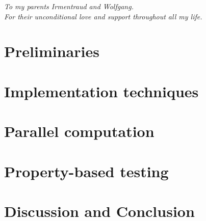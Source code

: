 \documentclass[oneside]{book}
\begin{document}
\clearpage
\begin{center}
    \thispagestyle{empty}
    \vspace*{\fill}
    \textit{To my parents Irmentraud and Wolfgang. \\ For their unconditional love and support throughout all my life.}
    \vspace*{\fill}
\end{center}

\clearpage


\epigraphhead[450]{}
\part{Preliminaries}




\epigraphhead[450]{}
\part{Implementation techniques}



\epigraphhead[450]{}
\part{Parallel computation}


\epigraphhead[450]{}
\part{Property-based testing}


\epigraphhead[450]{}
\part{Discussion and Conclusion}



\renewcommand\bibname{References}



\end{document}
